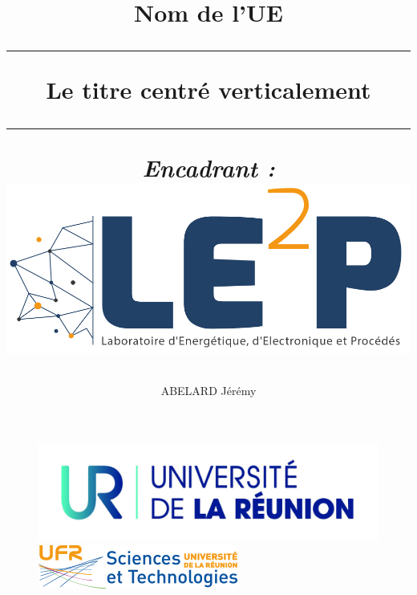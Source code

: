 \documentclass[10pt,a4paper,openright]{report}
\author{ABELARD Jérémy}
\begin{document}
 \begin{titlepage}
  \begin{figure}
   \begin{center}
     \includegraphics[scale=0.1]{UR}
     \hspace{1.8cm}
     \includegraphics[scale=0.8]{logoFST}
  
   \end{center}
   \begin{center}
   
    \title{\vspace{5cm} %
    
   
  
    \textrm{\Large Nom de l'UE}\\[2cm]
    {\hrule {\vspace{1cm}
     \textbf{Le titre centré verticalement}}
    \\[1cm]
    \hrule {\vspace{0.4cm}}}
    
     {\slshape Encadrant :}\\[2cm]
     \includegraphics[scale=0.1]{le2p_fondtrans}
     {\vspace{3cm}}   }%
    

\end{center}
\end{figure}
\end{titlepage}
\end{document}

